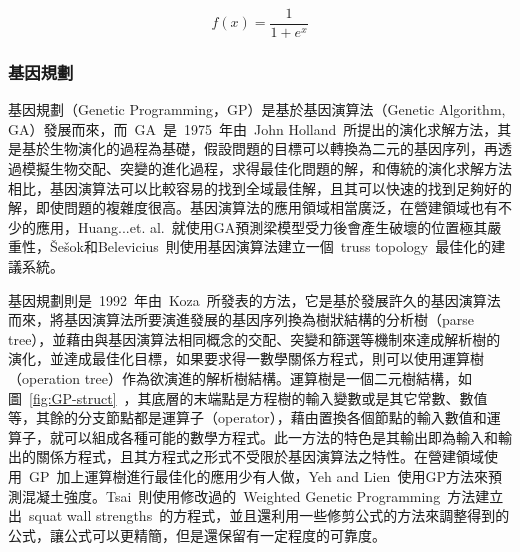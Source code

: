 \begin{equation} f(x) = \dfrac{1}{1 + e^x}  \label{eq:annsf}\end{equation} 


\subsubsection{基因規劃}

基因規劃（Genetic Programming，GP）是基於基因演算法（Genetic Algorithm, GA）發展而來，而~GA~是~1975~年由~John Holland\cite{holland1975adaptation}~所提出的演化求解方法，其是基於生物演化的過程為基礎，假設問題的目標可以轉換為二元的基因序列，再透過模擬生物交配、突變的進化過程，求得最佳化問題的解，和傳統的演化求解方法相比，基因演算法可以比較容易的找到全域最佳解，且其可以快速的找到足夠好的解，即使問題的複雜度很高。基因演算法的應用領域相當廣泛，在營建領域也有不少的應用，Huang...et. al.\cite{minshui2009study}~就使用GA預測梁模型受力後會產生破壞的位置極其嚴重性，Šešok和Belevicius\cite{vsevsok2008global}~則使用基因演算法建立一個~truss topology~最佳化的建議系統。

基因規劃則是~1992~年由~Koza\cite{koza1992genetic}~所發表的方法，它是基於發展許久的基因演算法而來，將基因演算法所要演進發展的基因序列換為樹狀結構的分析樹（parse tree），並藉由與基因演算法相同概念的交配、突變和篩選等機制來達成解析樹的演化，並達成最佳化目標，如果要求得一數學關係方程式，則可以使用運算樹（operation tree）作為欲演進的解析樹結構。運算樹是一個二元樹結構，如圖~\ref{fig:GP-struct}~，其底層的末端點是方程樹的輸入變數或是其它常數、數值等，其餘的分支節點都是運算子（operator），藉由置換各個節點的輸入數值和運算子，就可以組成各種可能的數學方程式。此一方法的特色是其輸出即為輸入和輸出的關係方程式，且其方程式之形式不受限於基因演算法之特性。在營建領域使用~GP~加上運算樹進行最佳化的應用少有人做，Yeh and Lien\cite{yeh2009knowledge}~使用GP方法來預測混凝土強度。Tsai\cite{tsai2011using}~則使用修改過的~Weighted Genetic Programming~方法建立出~squat wall strengths~的方程式，並且還利用一些修剪公式的方法來調整得到的公式，讓公式可以更精簡，但是還保留有一定程度的可靠度。


